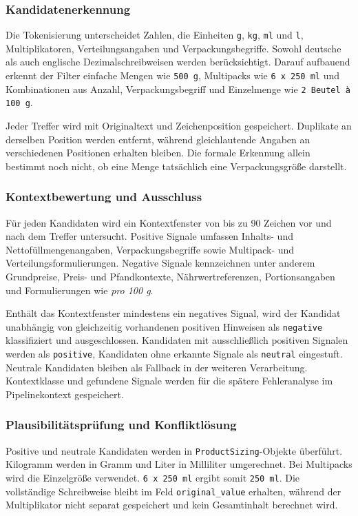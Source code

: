 \subsubsection{Kandidatenerkennung}

Die Tokenisierung unterscheidet Zahlen, die Einheiten \texttt{g}, \texttt{kg}, \texttt{ml} und \texttt{l}, Multiplikatoren, Verteilungsangaben und Verpackungsbegriffe. Sowohl 
deutsche als auch englische Dezimalschreibweisen werden berücksichtigt. Darauf aufbauend erkennt der Filter einfache Mengen wie \texttt{500 g}, Multipacks wie \texttt{6 x 250 ml} 
und Kombinationen aus Anzahl, Verpackungsbegriff und Einzelmenge wie \texttt{2 Beutel à 100 g}.

Jeder Treffer wird mit Originaltext und Zeichenposition gespeichert. Duplikate an derselben Position werden entfernt, während gleichlautende Angaben an verschiedenen Positionen 
erhalten bleiben. Die formale Erkennung allein bestimmt noch nicht, ob eine Menge tatsächlich eine Verpackungsgröße darstellt.

\subsubsection{Kontextbewertung und Ausschluss}

Für jeden Kandidaten wird ein Kontextfenster von bis zu 90 Zeichen vor und nach dem Treffer untersucht. Positive Signale umfassen Inhalts- und Nettofüllmengenangaben, 
Verpackungsbegriffe sowie Multipack- und Verteilungsformulierungen. Negative Signale kennzeichnen unter anderem Grundpreise, Preis- und Pfandkontexte, Nährwertreferenzen, 
Portionsangaben und Formulierungen wie \textit{pro 100 g}.

Enthält das Kontextfenster mindestens ein negatives Signal, wird der Kandidat unabhängig von gleichzeitig vorhandenen positiven Hinweisen als \texttt{negative} klassifiziert 
und ausgeschlossen. Kandidaten mit ausschließlich positiven Signalen werden als \texttt{positive}, Kandidaten ohne erkannte Signale als \texttt{neutral} eingestuft. Neutrale 
Kandidaten bleiben als Fallback in der weiteren Verarbeitung. Kontextklasse und gefundene Signale werden für die spätere Fehleranalyse im Pipelinekontext gespeichert.

\subsubsection{Plausibilitätsprüfung und Konfliktlösung}

Positive und neutrale Kandidaten werden in \texttt{ProductSizing}-Objekte überführt. Kilogramm werden in Gramm und Liter in Milliliter umgerechnet. Bei Multipacks wird die 
Einzelgröße verwendet. \texttt{6 x 250 ml} ergibt somit \texttt{250 ml}. Die vollständige Schreibweise bleibt im Feld \texttt{original\_value} erhalten, während der 
Multiplikator nicht separat gespeichert und kein Gesamtinhalt berechnet wird.

